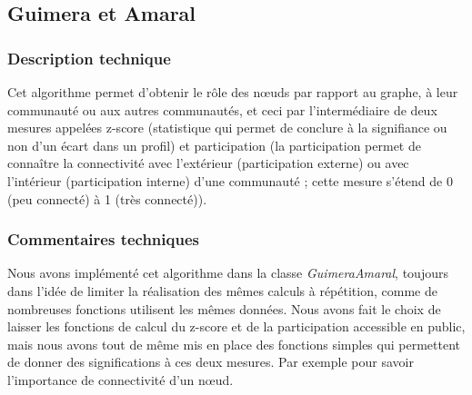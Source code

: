 \begin{titlepage}
{\subsection{Guimera et Amaral}
\subsubsection{Description technique}
{
Cet algorithme permet d'obtenir le rôle des nœuds par rapport au graphe, à leur communauté ou aux autres communautés, et ceci par l'intermédiaire de deux mesures appelées z-score (statistique qui permet de conclure à la signifiance ou non d'un écart dans un profil) et participation (la participation permet de connaître la connectivité avec l'extérieur (participation externe) ou avec l'intérieur (participation interne) d'une communauté ; cette mesure s'étend de 0 (peu connecté) à 1 (très connecté)).
}
\subsubsection{Commentaires techniques}
{
Nous avons implémenté cet algorithme dans la classe \textit{GuimeraAmaral}, toujours dans l'idée de limiter la réalisation des mêmes calculs à répétition, comme de nombreuses fonctions utilisent les mêmes données. Nous avons fait le choix de laisser les fonctions de calcul du z-score et de la participation accessible en public, mais nous avons tout de même mis en place des fonctions simples qui permettent de donner des significations à ces deux mesures. Par exemple pour savoir l'importance de connectivité d'un nœud.
}
}
\end{titlepage}
